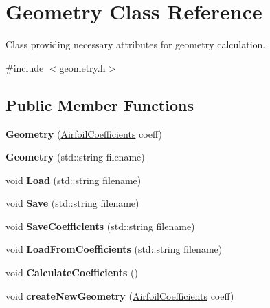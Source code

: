 \hypertarget{class_geometry}{}\section{Geometry Class Reference}
\label{class_geometry}


Class providing necessary attributes for geometry calculation.  




{\ttfamily \#include $<$geometry.\+h$>$}

\subsection*{Public Member Functions}
\begin{DoxyCompactItemize}
\item 
\hypertarget{class_geometry_ae86ccba6c6c851a2ff39987c7a9e842a}{}\label{class_geometry_ae86ccba6c6c851a2ff39987c7a9e842a} 
{\bfseries Geometry} (\hyperlink{struct_airfoil_coefficients}{Airfoil\+Coefficients} coeff)
\item 
\hypertarget{class_geometry_a1ef839b1538d88e53b709c69da1845f8}{}\label{class_geometry_a1ef839b1538d88e53b709c69da1845f8} 
{\bfseries Geometry} (std\+::string filename)
\item 
\hypertarget{class_geometry_a6ed211b48008ba87cc3b6744e0ea063e}{}\label{class_geometry_a6ed211b48008ba87cc3b6744e0ea063e} 
void {\bfseries Load} (std\+::string filename)
\item 
\hypertarget{class_geometry_ab4c5ee8c0ce3ef2d6df19381663ec5f3}{}\label{class_geometry_ab4c5ee8c0ce3ef2d6df19381663ec5f3} 
void {\bfseries Save} (std\+::string filename)
\item 
\hypertarget{class_geometry_acc74836e9c5bb1534fef8e7ff84ef984}{}\label{class_geometry_acc74836e9c5bb1534fef8e7ff84ef984} 
void {\bfseries Save\+Coefficients} (std\+::string filename)
\item 
\hypertarget{class_geometry_a331921e3edad630226a378bbacfce1a7}{}\label{class_geometry_a331921e3edad630226a378bbacfce1a7} 
void {\bfseries Load\+From\+Coefficients} (std\+::string filename)
\item 
\hypertarget{class_geometry_a7385b0dc9c7567efd3b37c206cfeda30}{}\label{class_geometry_a7385b0dc9c7567efd3b37c206cfeda30} 
void {\bfseries Calculate\+Coefficients} ()
\item 
\hypertarget{class_geometry_a5145d4ec1bdbc033eb510a54a6ac2eae}{}\label{class_geometry_a5145d4ec1bdbc033eb510a54a6ac2eae} 
void {\bfseries create\+New\+Geometry} (\hyperlink{struct_airfoil_coefficients}{Airfoil\+Coefficients} coeff)

\end{DoxyCompactItemize}
